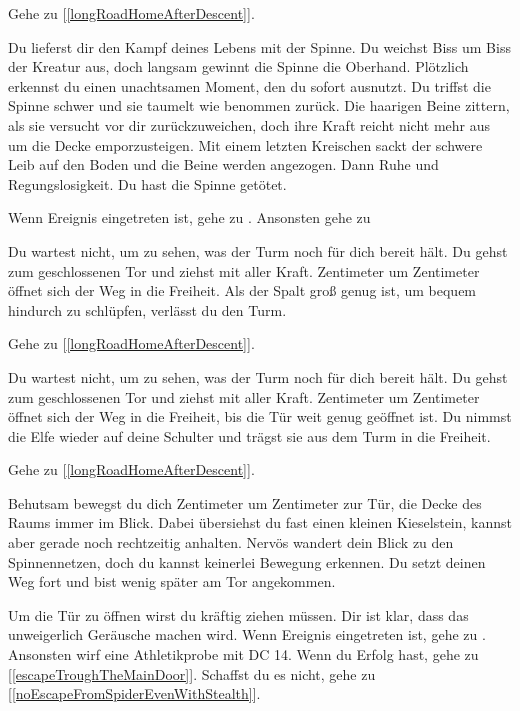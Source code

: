 Gehe zu [\ref{longRoadHomeAfterDescent}].


Du lieferst dir den Kampf deines Lebens mit der Spinne. Du weichst Biss um Biss der Kreatur aus, doch langsam gewinnt die Spinne die Oberhand. Plötzlich erkennst du einen unachtsamen Moment, den du sofort ausnutzt. Du triffst die Spinne schwer und sie taumelt wie benommen zurück. Die haarigen Beine zittern, als sie versucht vor dir zurückzuweichen, doch ihre Kraft reicht nicht mehr aus um die Decke emporzusteigen. Mit einem letzten Kreischen sackt der schwere Leib auf den Boden und die Beine werden angezogen. Dann Ruhe und Regungslosigkeit. Du hast die Spinne getötet.

Wenn Ereignis  eingetreten ist, gehe zu . Ansonsten gehe zu 


Du wartest nicht, um zu sehen, was der Turm noch für dich bereit hält. Du gehst zum geschlossenen Tor und ziehst mit aller Kraft. Zentimeter um Zentimeter öffnet sich der Weg in die Freiheit. Als der Spalt groß genug ist, um bequem hindurch zu schlüpfen, verlässt du den Turm.

Gehe zu [\ref{longRoadHomeAfterDescent}].


Du wartest nicht, um zu sehen, was der Turm noch für dich bereit hält. Du gehst zum geschlossenen Tor und ziehst mit aller Kraft. Zentimeter um Zentimeter öffnet sich der Weg in die Freiheit, bis die Tür weit genug geöffnet ist. Du nimmst die Elfe wieder auf deine Schulter und trägst sie aus dem Turm in die Freiheit.

Gehe zu [\ref{longRoadHomeAfterDescent}].


Behutsam bewegst du dich Zentimeter um Zentimeter zur Tür, die Decke des Raums immer im Blick. Dabei übersiehst du fast einen kleinen Kieselstein, kannst aber gerade noch rechtzeitig anhalten. Nervös wandert dein Blick zu den Spinnennetzen, doch du kannst keinerlei Bewegung erkennen.
Du setzt deinen Weg fort und bist wenig später am Tor angekommen.

Um die Tür zu öffnen wirst du kräftig ziehen müssen. Dir ist klar, dass das unweigerlich Geräusche machen wird.
Wenn Ereignis  eingetreten ist, gehe zu . Ansonsten
wirf eine Athletikprobe mit DC 14. Wenn du Erfolg hast, gehe zu [\ref{escapeTroughTheMainDoor}]. Schaffst du es nicht, gehe zu [\ref{noEscapeFromSpiderEvenWithStealth}].

